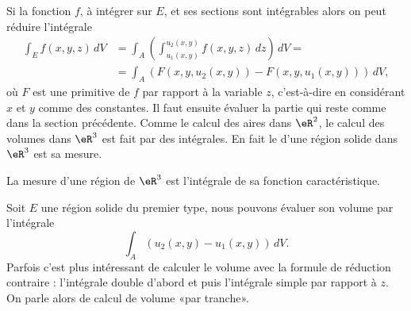 Si la fonction \( f\), à intégrer sur \( E\), et ses sections sont intégrables  alors on peut réduire l'intégrale
\begin{equation}
	\begin{aligned}
		\int_E  f(x,y,z)\, dV & =\int_A\left(\int_{u_1(x,y)}^{u_2(x,y)}f(x,y,z)\, dz \right) \, dV= \\
		                      & =\int_A\left(F(x,y,u_2(x,y))-F(x,y,u_1(x,y))\right)\, dV,
	\end{aligned}
\end{equation}
où \( F\) est une primitive de \( f\) par rapport à la variable \( z\), c'est-à-dire en considérant \( x\) et \( y\) comme des constantes. Il faut ensuite évaluer la partie qui reste comme dans la section précédente. Comme le calcul des aires dans \( \eR^2\), le calcul des volumes dans \( \eR^3\) est fait par des intégrales. En fait le  d'une région solide dans \( \eR^3\) est sa mesure.
\begin{definition}
	La mesure d'une région de  \( \eR^3\) est l'intégrale de sa fonction caractéristique.
\end{definition}
Soit \( E\) une région solide du premier type, nous pouvons évaluer son volume par l'intégrale
\[
	\int_A\left(u_2(x,y)-u_1(x,y)\right)\, dV.
\]
Parfois c'est plus intéressant de calculer le volume avec la formule de réduction contraire : l'intégrale double d'abord et puis l'intégrale simple par rapport à \( z\). On parle alors de calcul de volume «par tranche».

